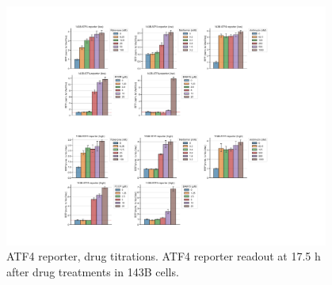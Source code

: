 \begin{figure}
    \centering
    \includegraphics[width=0.95\textwidth]{figures/chap2/app/atf4_ETCtit.pdf}
    \caption[ATF4 reporter, drug titrations]{
    ATF4 reporter, drug titrations.
    ATF4 reporter readout at 17.5 h after drug treatments in 143B cells.
    }
    \label{fig:app_ch2:atf4_ETCtit}
\end{figure}




